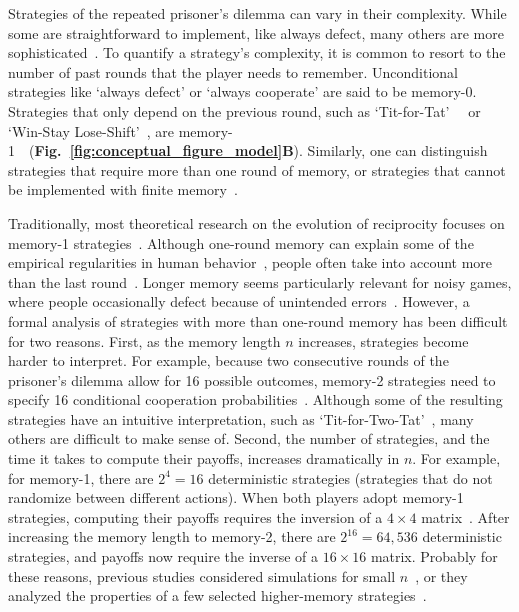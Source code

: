 \documentclass[9pt,twocolumn,twoside]{pnas-new}
\newcommand{\figref}[1]{{\textbf{Fig.~\ref{#1}}}}
\begin{document}
Strategies of the repeated prisoner's dilemma can vary in their complexity.
While some are straightforward to implement, like always defect, many others are more sophisticated~\cite{harper:PLOSONE:2017, knight:PLOSONE:2018}.
To quantify a strategy's complexity, it is common to resort to the number of past rounds that the player needs to remember. 
Unconditional strategies like `always defect' or `always cooperate' are said to be \mbox{memory-0}. 
Strategies that only depend on the previous round, such as `Tit-for-Tat'~~\cite{axelrod:AAAS:1981,Duersch:IJGT:2013} or `Win-Stay Lose-Shift'~\cite{Kraines:TaD:1989,nowak:Nature:1993}, are \mbox{memory-1}~~(\figref{fig:conceptual_figure_model}\textbf{B}). 
Similarly, one can distinguish strategies that require more than one round of memory, or strategies that cannot be implemented with finite memory~\cite{Garcia:FRAI:2018}. 

Traditionally, most theoretical research on the evolution of reciprocity focuses on memory-1 strategies~\citep{nowak:Nature:1993,imhof:PNAS:2005,grujic:jtb:2012,van-segbroeck:prl:2012,press:PNAS:2012,stewart:pnas:2013,Toupo:IJBC:2014,stewart:pnas:2014, akin:EGADS:2016,glynatsi:scientific:2020,chen:PNASnexus:2023, ueda:JPSJ:2022}.
Although one-round memory can explain some of the empirical regularities in human behavior~\cite{engle:ET:2006, dal:AER:2011, camera:GEB:2012, bruttel:TD:2012,Montero-Porras:SciRep:2022}, people often take into account more than the last round~\cite{romero:EER:2018, kleiman:TEJ:2018}.
Longer memory seems particularly relevant for noisy games, where people occasionally defect because of unintended errors~\cite{fudenberg:AER:2012}.
However, a formal analysis of strategies with more than one-round memory has been difficult for two reasons. 
First, as the memory length $n$ increases, strategies become harder to interpret. 
For example, because two consecutive rounds of the prisoner's dilemma allow for 16 possible outcomes, memory-2 strategies need to specify 16 conditional cooperation probabilities~\citep{hauert:PRSB:1997}. 
Although some of the resulting strategies have an intuitive interpretation, such as `Tit-for-Two-Tat'~\citep{axelrod:AAAS:1981}, many others are difficult to make sense of. 
Second, the number of strategies, and the time it takes to compute their payoffs, increases dramatically in $n$. 
For example, for memory-1, there are $2^4\!=\!16$ deterministic strategies (strategies that do not randomize between different actions). 
When both players adopt memory-1 strategies, computing their payoffs requires the inversion of a $4\!\times\!4$ matrix~\cite{sigmund2010}. 
After increasing the memory length to memory-2, there are $2^{16}\!=\!64,536$ deterministic strategies, and payoffs now require the inverse of a $16\!\times\!16$ matrix. 
Probably for these reasons, previous studies considered simulations for small $n$~\citep{hauert:PRSB:1997,stewart:scientific:2016,Murase:PLoSCompBio:2023a, ueda:ORF:2022}, or they analyzed the properties of a few selected higher-memory strategies~\citep{hilbe:PNAS:2017,ueda:RSOP:2021,li:NatureCompSci:2022}. 
\end{document}
